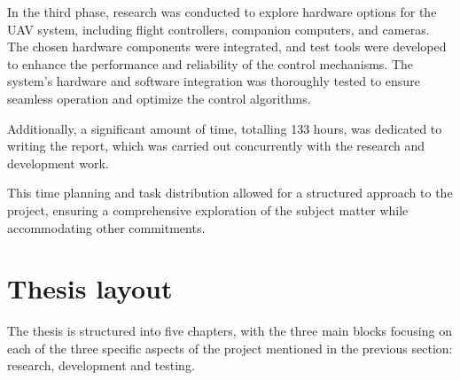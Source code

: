 In the third phase, research was conducted to explore hardware options for the UAV system, including flight controllers, companion computers, and cameras. The chosen hardware components were integrated, and test tools were developed to enhance the performance and reliability of the control mechanisms. The system's hardware and software integration was thoroughly tested to ensure seamless operation and optimize the control algorithms.


Additionally, a significant amount of time, totalling 133 hours, was dedicated to writing the report, which was carried out concurrently with the research and development work.

This time planning and task distribution allowed for a structured approach to the project, ensuring a comprehensive exploration of the subject matter while accommodating other commitments.

\section{Thesis layout}
\label{sec:layout}



The thesis is structured into five chapters, with the three main blocks focusing on each of the three specific aspects of the project mentioned in the previous section: research, development and testing. 


